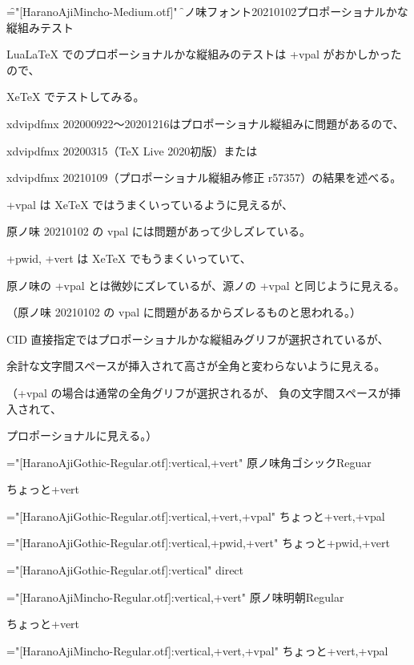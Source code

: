 

\font\f="[HaranoAjiMincho-Medium.otf]"
\f

原ノ味フォント20210102プロポーショナルかな縦組みテスト

LuaLaTeX でのプロポーショナルかな縦組みのテストは +vpal がおかしかったので、

XeTeX でテストしてみる。

xdvipdfmx 202000922～20201216はプロポーショナル縦組みに問題があるので、

xdvipdfmx 20200315（TeX Live 2020初版）または

xdvipdfmx 20210109（プロポーショナル縦組み修正 r57357）の結果を述べる。

+vpal は XeTeX ではうまくいっているように見えるが、

原ノ味 20210102 の vpal には問題があって少しズレている。

+pwid, +vert は XeTeX でもうまくいっていて、

原ノ味の +vpal とは微妙にズレているが、源ノの +vpal と同じように見える。

（原ノ味 20210102 の vpal に問題があるからズレるものと思われる。）

CID 直接指定ではプロポーショナルかな縦組みグリフが選択されているが、

余計な文字間スペースが挿入されて高さが全角と変わらないように見える。

（+vpal の場合は通常の全角グリフが選択されるが、
負の文字間スペースが挿入されて、

プロポーショナルに見える。）

\font\hgr="[HaranoAjiGothic-Regular.otf]:vertical,+vert"
\hgr
原ノ味角ゴシックReguar

ちょっと+vert

\font\hgrvpal="[HaranoAjiGothic-Regular.otf]:vertical,+vert,+vpal"
\hgrvpal
ちょっと+vert,+vpal

\font\hgrpwidvert="[HaranoAjiGothic-Regular.otf]:vertical,+pwid,+vert"
\hgrpwidvert
ちょっと+pwid,+vert

\font\hgrdirect="[HaranoAjiGothic-Regular.otf]:vertical"
\hgrdirect
{}%
direct

\font\hmr="[HaranoAjiMincho-Regular.otf]:vertical,+vert"
\hmr
原ノ味明朝Regular

ちょっと+vert

\font\hmrvpal="[HaranoAjiMincho-Regular.otf]:vertical,+vert,+vpal"
\hmrvpal
ちょっと+vert,+vpal

